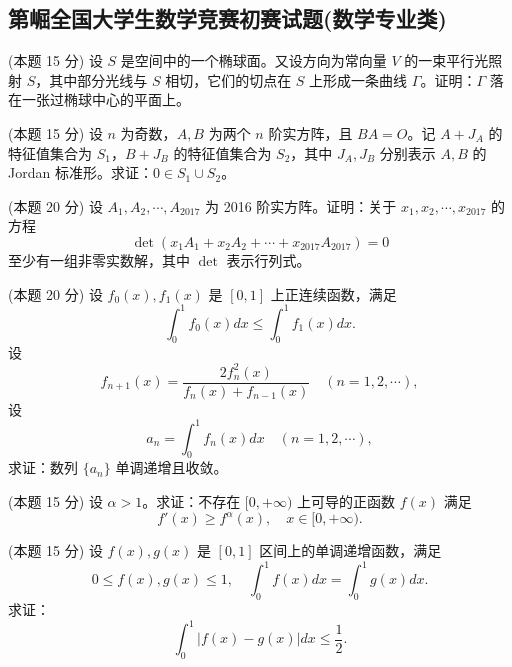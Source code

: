 \documentclass[loose]{ExBook}
\begin{document}
\subsection{第崛全国大学生数学竞赛初赛试题(数学专业类)}
\begin{qitems}
    \begin{bbox}
        \qitem (本题 15 分) 设 \( S \) 是空间中的一个椭球面。又设方向为常向量 \( V \) 的一束平行光照射 \( S \)，其中部分光线与 \( S \) 相切，它们的切点在 \( S \) 上形成一条曲线 \( \Gamma \)。证明：\( \Gamma \) 落在一张过椭球中心的平面上。
    \end{bbox}

    \begin{bbox}
        \qitem (本题 15 分) 设 \( n \) 为奇数，\( A, B \) 为两个 \( n \) 阶实方阵，且 \( BA = O \)。记 \( A + J_A \) 的特征值集合为 \( S_1 \)，\( B + J_B \) 的特征值集合为 \( S_2 \)，其中 \( J_A, J_B \) 分别表示 \( A, B \) 的 Jordan 标准形。求证：\( 0 \in S_1 \cup S_2 \)。
    \end{bbox}

    \begin{bbox}
        \qitem (本题 20 分) 设 \( A_1, A_2, \cdots, A_{2017} \) 为 2016 阶实方阵。证明：关于 \( x_1, x_2, \cdots, x_{2017} \) 的方程
        \[
        \det (x_1 A_1 + x_2 A_2 + \cdots + x_{2017} A_{2017}) = 0
        \]
        至少有一组非零实数解，其中 \(\det\) 表示行列式。
    \end{bbox}

    \begin{bbox}
        \qitem (本题 20 分) 设 \( f_0(x), f_1(x) \) 是 \([0, 1]\) 上正连续函数，满足
        \[
        \int_0^1 f_0(x) dx \leq \int_0^1 f_1(x) dx.
        \]
        设
        \[
        f_{n+1}(x) = \frac{2f_n^2(x)}{f_n(x) + f_{n-1}(x)} \quad (n=1, 2, \cdots),
        \]
        设
        \[
        a_n = \int_0^1 f_n(x) dx \quad (n=1, 2, \cdots),
        \]
        求证：数列 \(\{a_n\}\) 单调递增且收敛。
    \end{bbox}

    \begin{bbox}
        \qitem (本题 15 分) 设 \( \alpha > 1 \)。求证：不存在 \([0, +\infty)\) 上可导的正函数 \( f(x) \) 满足
        \[
        f'(x) \geq f^\alpha(x), \quad x \in [0, +\infty).
        \]
    \end{bbox}

    \begin{bbox}
        \qitem (本题 15 分) 设 \( f(x), g(x) \) 是 \([0, 1]\) 区间上的单调递增函数，满足
        \[
        0 \leq f(x), g(x) \leq 1, \quad \int_0^1 f(x) dx = \int_0^1 g(x) dx.
        \]
        求证：
        \[
        \int_0^1 |f(x) - g(x)| dx \leq \frac{1}{2}.
        \]
    \end{bbox}
\end{qitems}
\end{document}
